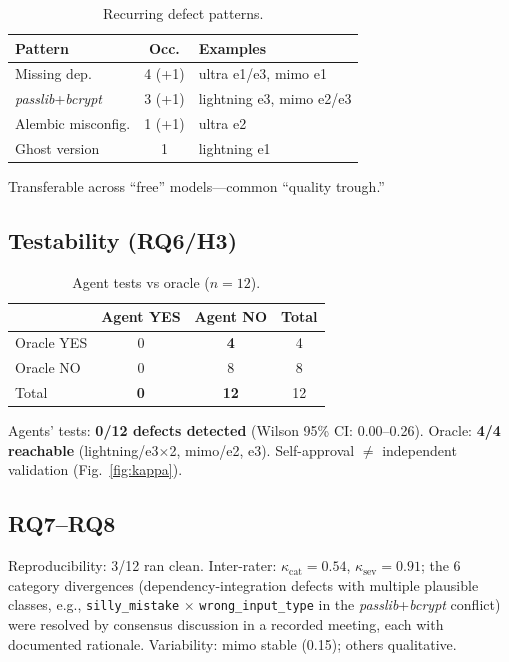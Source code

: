 \documentclass[10pt,twocolumn]{article}
\begin{document}
\begin{table}[t]
\caption{Recurring defect patterns.}
\label{tab:patterns}
\small
\begin{tabularx}{\columnwidth}{@{}l c X@{}}
\toprule
\textbf{Pattern} & \textbf{Occ.} & \textbf{Examples}\\
\midrule
Missing dep. & 4 (+1) & ultra e1/e3, mimo e1\\
\emph{passlib}+\emph{bcrypt} & 3 (+1) & lightning e3, mimo e2/e3\\
Alembic misconfig. & 1 (+1) & ultra e2\\
Ghost version & 1 & lightning e1\\
\bottomrule
\end{tabularx}
\end{table}

Transferable across ``free'' models---common ``quality trough.''

\subsection{Testability (RQ6/H3)}

\begin{table}[t]
\caption{Agent tests vs oracle ($n=12$).}
\label{tab:detect}
\small
\begin{tabularx}{\columnwidth}{@{}l c c c@{}}
\toprule
& \textbf{Agent YES} & \textbf{Agent NO} & \textbf{Total}\\
\midrule
Oracle YES & 0 & \textbf{4} & 4\\
Oracle NO & 0 & 8 & 8\\
Total & \textbf{0} & \textbf{12} & 12\\
\bottomrule
\end{tabularx}
\end{table}

Agents' tests: \textbf{0/12 defects detected} (Wilson 95\% CI: 0.00--0.26). Oracle: \textbf{4/4 reachable} (lightning/e3$\times$2, mimo/e2, e3). Self-approval $\neq$ independent validation (Fig.~\ref{fig:kappa}).

\subsection{RQ7--RQ8}

Reproducibility: 3/12 ran clean. Inter-rater: $\kappa_{\text{cat}}=0.54$, $\kappa_{\text{sev}}=0.91$; the 6 category divergences (dependency-integration defects with multiple plausible classes, e.g., \texttt{silly\_mistake} $\times$ \texttt{wrong\_input\_type} in the \emph{passlib}+\emph{bcrypt} conflict) were resolved by consensus discussion in a recorded meeting, each with documented rationale. Variability: mimo stable (0.15); others qualitative.
\end{document}
